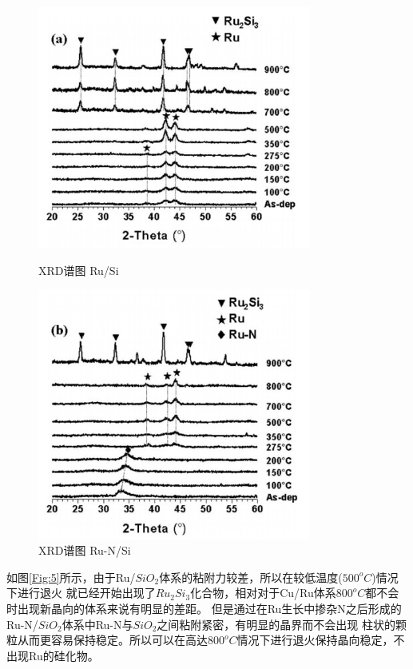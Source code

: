 \documentclass[UTF8,a4paper,12pt]{ctexart}%
\begin{document}
\begin{figure}[htb]
	\centering
	\begin{minipage}[t]{0.5\textwidth}
	\centering
	\includegraphics[width=0.8\textwidth]{5.jpg}
	\caption{XRD谱图 Ru/Si}
	\label{Fig:5}
	\end{minipage}
	\begin{minipage}[t]{0.45\textwidth}
	\centering
	\includegraphics[width=0.8\textwidth]{6.jpg}
	\caption{XRD谱图 Ru-N/Si}
	\label{Fig:6}
	\end{minipage}
\end{figure}

如图\ref{Fig:5}所示，由于Ru/$SiO_2$体系的粘附力较差，所以在较低温度($500^oC$)情况下进行退火
就已经开始出现了$Ru_2Si_3$化合物，相对对于Cu/Ru体系$800^oC$都不会时出现新晶向的体系来说有明显的差距。
但是通过在Ru生长中掺杂N之后形成的Ru-N/$SiO_2$体系中Ru-N与$SiO_2$之间粘附紧密，有明显的晶界而不会出现
柱状的颗粒从而更容易保持稳定。所以可以在高达$800^oC$情况下进行退火保持晶向稳定，不出现Ru的硅化物。
\end{document}
